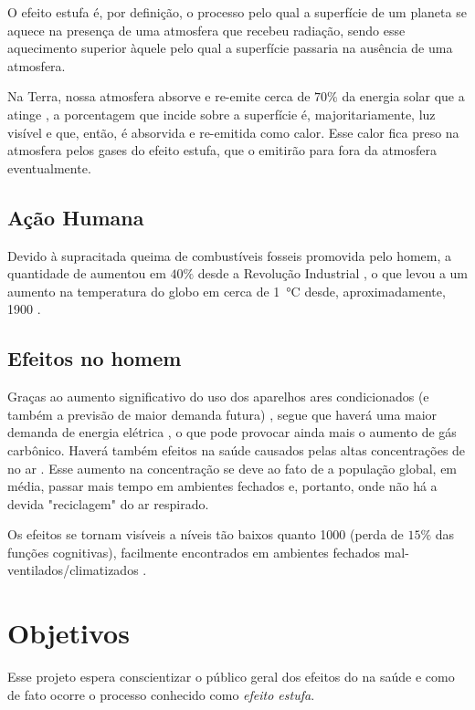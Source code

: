 \documentclass[article,11pt,oneside,a4paper,
	english,	%
	brazil,		%
	sumario=tradicional]{abntex2}
\begin{document}
O efeito estufa é, por definição, o processo pelo qual a superfície de um planeta se aquece na presença de uma atmosfera que recebeu radiação, sendo esse aquecimento superior àquele pelo qual a superfície passaria na ausência de uma atmosfera.

Na Terra, nossa atmosfera absorve e re-emite cerca de $ 70\% $ da energia solar que a atinge \cite{NASA2009}, a porcentagem que incide sobre a superfície é, majoritariamente, luz visível e que, então, é absorvida e re-emitida como calor. Esse calor fica preso na atmosfera pelos gases do efeito estufa, que o emitirão para fora da atmosfera eventualmente.

\subsection{Ação Humana}

Devido à supracitada queima de combustíveis fosseis promovida pelo homem, a quantidade de  aumentou em $ 40\% $ desde a Revolução Industrial \cite{WMO2014,Stuiver1984}, o que levou a um aumento na temperatura do globo em cerca de \SI{1}{\degreeCelsius} desde, aproximadamente, 1900 \cite{NASAevi,Hansen2010}.


\subsection{Efeitos no homem}

Graças ao aumento significativo do uso dos aparelhos ares condicionados (e também a previsão de maior demanda futura) \cite{Agency2018}, segue que haverá uma maior demanda de energia elétrica \cite{Agency2016}, o que pode provocar ainda mais o aumento de gás carbônico. Haverá também efeitos na saúde causados pelas altas concentrações de  no ar \cite{Allen2016,Stafford2015}. Esse aumento na concentração se deve ao fato de a população global, em média, passar mais tempo em ambientes fechados e, portanto, onde não há a devida "reciclagem" do ar respirado.

Os efeitos se tornam visíveis a níveis tão baixos quanto \SI{1000}{\ppm} (perda de $ 15\% $ das funções cognitivas), facilmente encontrados em ambientes fechados mal-ventilados/climatizados \cite{Allen2016,Stafford2015}.


\section{Objetivos}

Esse projeto espera conscientizar o público geral dos efeitos do  na saúde e como de fato ocorre o processo conhecido como \textit{efeito estufa}.
\end{document}
